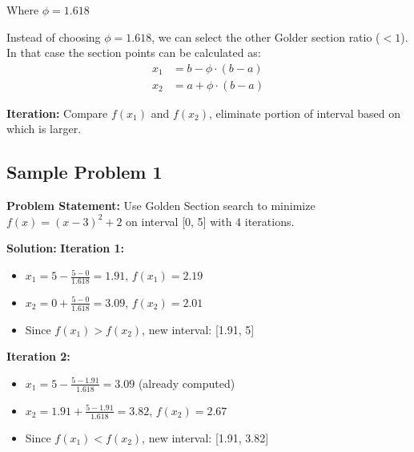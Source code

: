 \documentclass[
  letterpaper,
  DIV=11,
  numbers=noendperiod]{scrreprt}
\providecommand{\tightlist}{%
  \setlength{\itemsep}{0pt}\setlength{\parskip}{0pt}}
\begin{document}
Where \(\phi=1.618\)

\begin{tcolorbox}[enhanced jigsaw, leftrule=.75mm, rightrule=.15mm, colback=white, colbacktitle=quarto-callout-note-color!10!white, arc=.35mm, opacityback=0, toptitle=1mm, bottomrule=.15mm, bottomtitle=1mm, titlerule=0mm, title=\textcolor{quarto-callout-note-color}{\faInfo}\hspace{0.5em}{Alter:}, toprule=.15mm, left=2mm, coltitle=black, breakable, colframe=quarto-callout-note-color-frame, opacitybacktitle=0.6]

Instead of choosing \(\phi=1.618\), we can select the other Golder
section ratio (\(<1\)). In that case the section points can be
calculated as: \[
\begin{aligned}
x_1 & = b - \phi\cdot (b-a) \\
x_2 & = a + \phi\cdot (b-a)
\end{aligned}
\]

\end{tcolorbox}

\textbf{Iteration:} Compare \(f(x_1)\) and \(f(x_2)\), eliminate portion
of interval based on which is larger.

\subsection{Sample Problem 1}\label{sample-problem-1}

\textbf{Problem Statement:} Use Golden Section search to minimize
\(f(x) = (x-3)^2 + 2\) on interval {[}0, 5{]} with 4 iterations.

\textbf{Solution:} \textbf{Iteration 1:}

\begin{itemize}
\tightlist
\item
  \(x_1 = 5 - \frac{5-0}{1.618} = 1.91\), \(f(x_1) = 2.19\)
\item
  \(x_2 = 0 + \frac{5-0}{1.618} = 3.09\), \(f(x_2) = 2.01\)
\item
  Since \(f(x_1) > f(x_2)\), new interval: {[}1.91, 5{]}
\end{itemize}

\textbf{Iteration 2:}

\begin{itemize}
\tightlist
\item
  \(x_1 = 5 - \frac{5-1.91}{1.618} = 3.09\) (already computed)
\item
  \(x_2 = 1.91 + \frac{5-1.91}{1.618} = 3.82\), \(f(x_2) = 2.67\)
\item
  Since \(f(x_1) < f(x_2)\), new interval: {[}1.91, 3.82{]}
\end{itemize}
\end{document}
